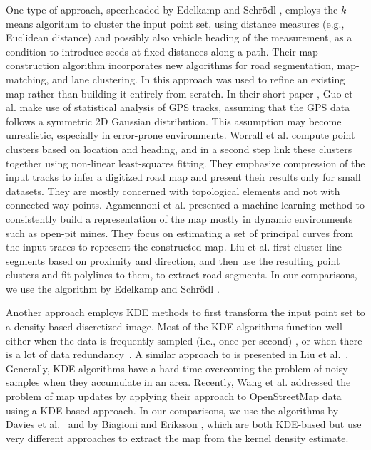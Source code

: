 \documentclass[natbib]{svjour3}                    \smartqed  \usepackage[table]{xcolor}
\begin{document}
One type of approach, speerheaded by Edelkamp and Schr\"odl \cite{edelkamp:2003:rpmi}, employs the $k$-means algorithm to cluster the input point set, using distance measures (e.g., Euclidean distance) and possibly also vehicle heading of the measurement, as a condition to introduce seeds at fixed distances along a path. Their map construction algorithm incorporates new algorithms for road segmentation, map-matching, and lane clustering. In \cite{schroedl:2004:mgtm} this approach was used to refine an existing map rather than building it entirely from scratch. 
In their short paper \cite{DBLP:conf/igarss/GuoIK07}, Guo et al. make use of statistical analysis of GPS tracks, assuming that the GPS data follows a symmetric 2D Gaussian distribution. This assumption may become unrealistic, especially in error-prone environments. Worrall et al. \cite{Worrall:2007:automatedprocess} compute point clusters based on location and heading, and in a second step link these clusters together using non-linear least-squares fitting. They emphasize compression of the input tracks to infer a digitized road map and present their results only for small datasets. They are mostly concerned with topological elements and not with connected way points.
Agamennoni et al. \cite{Agamennoni:2011:RIP:2218592.2218957} presented a 
machine-learning method to consistently build a representation of the map mostly in dynamic environments such as open-pit mines. They focus on estimating a set of principal curves from the input traces to represent the constructed map.
Liu et al. \cite{Liu:2012:MLS:2339530.2339637} first cluster line segments based on proximity and direction, and then use the resulting point clusters and fit polylines to them, to extract road segments. 
In our comparisons, we use the algorithm by Edelkamp and Schr\"odl \cite{edelkamp:2003:rpmi}.

Another approach employs KDE methods to first transform the input point set to a density-based discretized image. Most of the KDE algorithms function well either when the data is frequently sampled (i.e., once per second) \cite{chen:2008:rdmg}, or when there is a lot of data redundancy~\cite{Biagioni:2012:MIF:2424321.2424333, sten:2011:mga, shi:2009:agm, Davies:2006:SDR:1175887.1176088}. A similar approach to \cite{Biagioni:2012:MIF:2424321.2424333} is presented in Liu et al.\ \cite{Liu:2012:MLS:2339530.2339637}.
Generally, KDE algorithms have a hard time overcoming the problem of noisy samples when they accumulate in an area. Recently, Wang et al. \cite{2013:csu:wlw} addressed the problem of map updates by applying their approach to OpenStreetMap data using a KDE-based approach.
In our comparisons, we use the algorithms by Davies et al.\ \cite{Davies:2006:SDR:1175887.1176088} and by Biagioni and Eriksson \cite{Biagioni:2012:MIF:2424321.2424333}, which are both KDE-based but use very different approaches to extract the map from the kernel density estimate.
 
\end{document}

